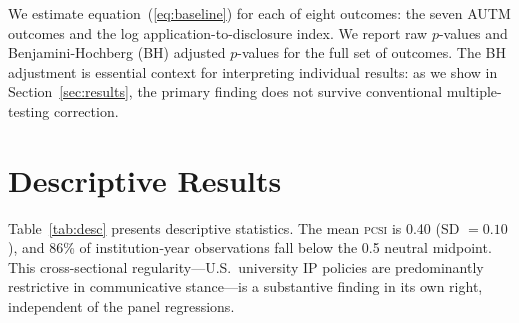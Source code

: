 \documentclass[12pt]{article}
\newcommand{\PCSI}{\textsc{pcsi}}
\begin{document}
We estimate equation~(\ref{eq:baseline}) for each of eight outcomes: the seven AUTM
outcomes and the log application-to-disclosure index. We report raw $p$-values and
Benjamini-Hochberg (BH) adjusted $p$-values \citep{bakerlarkerwang2022} for the full
set of outcomes. The BH adjustment is essential context for interpreting individual
results: as we show in Section~\ref{sec:results}, the primary finding does not survive
conventional multiple-testing correction.

\section{Descriptive Results}
\label{sec:descriptive}

Table~\ref{tab:desc} presents descriptive statistics. The mean \PCSI{} is 0.40
(SD $= 0.10$), and 86\% of institution-year observations fall below the 0.5 neutral
midpoint. This cross-sectional regularity---U.S.\ university IP policies are
predominantly restrictive in communicative stance---is a substantive finding in its
own right, independent of the panel regressions.
\end{document}
